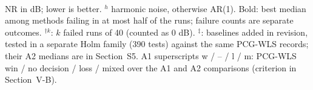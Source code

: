 \begin{table}[t]
{}
\\[2pt]{\scriptsize NR in dB; lower is better. $^h$ harmonic noise, otherwise AR(1). Bold: best median among methods failing in at most half of the runs; failure counts are separate outcomes. $^{\dagger k}$: $k$ failed runs of 40 (counted as 0 dB). $^\ddagger$: baselines added in revision, tested in a separate Holm family (390 tests) against the same PCG-WLS records; their A2 medians are in Section~S5.} {\scriptsize A1 superscripts w / -- / l / m: PCG-WLS win / no decision / loss / mixed over the A1 and A2 comparisons (criterion in Section~V-B).}
\end{table}
